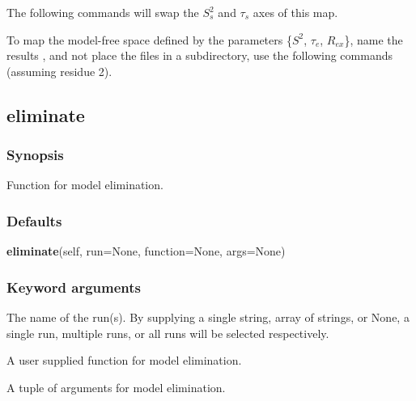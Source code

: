 The following commands will swap the $S^2_s$ and $\tau_s$ axes of this map.




To map the model-free space  defined by the parameters \{$S^2$, $\tau_e$, $R_{ex}$\}, name the results , and not place the files in a subdirectory, use the following commands (assuming residue 2).






\newpage

\subsection{eliminate}


\subsubsection{Synopsis}

Function for model elimination.



\subsubsection{Defaults}

\textsf{\textbf{eliminate}(self, run=None, function=None, args=None)}


\subsubsection{Keyword arguments}

  The name of the run(s).  By supplying a single string, array of strings, or None, a single run, multiple runs, or all runs will be selected respectively. 

  A user supplied function for model elimination. 

  A tuple of arguments for model elimination. 




